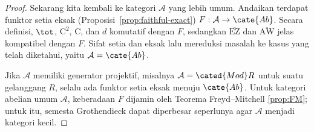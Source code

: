 \begin{proof}
	Sekarang kita kembali ke kategori $\mathcal{A}$ yang lebih umum. Andaikan terdapat funktor
	setia eksak (Proposisi~\ref{prop:faithful-exact})
	$F:\mathcal{A}\to\cate{Ab}$. Secara definisi, $\tot$, $\mathrm{C}^2$,
	$\mathrm{C}$, dan $d$ komutatif dengan $F$, sedangkan
	$\overline{\mathrm{EZ}}$ dan $\overline{\mathrm{AW}}$ jelas kompatibel
	dengan $F$. Sifat setia dan eksak lalu mereduksi masalah ke kasus yang
	telah diketahui, yaitu $\mathcal{A}=\cate{Ab}$.

	Jika $\mathcal{A}$ memiliki generator projektif, misalnya
	$\mathcal{A}=\cated{Mod}R$ untuk suatu gelanggang $R$, selalu ada
	funktor setia eksak menuju $\cate{Ab}$. Untuk kategori abelian umum
	$\mathcal{A}$, keberadaan $F$ dijamin oleh Teorema Freyd--Mitchell
	\ref{prop:FM}; untuk itu, semesta Grothendieck dapat diperbesar
	seperlunya agar $\mathcal{A}$ menjadi kategori kecil.
\end{proof}

